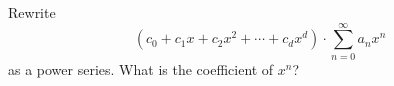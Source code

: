 Rewrite 
\[
(c_0 + c_1x + c_2 x^2 + \cdots + c_d x^d) \cdot \sum_{n = 0}^\infty a_n x^n
\] 
as a
power series.
What is the coefficient of $x^n$?
